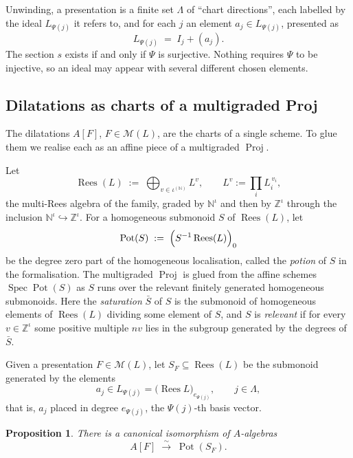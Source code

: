 \documentclass[pdflatex,sn-mathphys-num]{sn-jnl}
\theoremstyle{plain}
\newtheorem{proposition}[theorem]{Proposition}
\theoremstyle{definition}
\newcommand{\Spec}{\operatorname{Spec}}
\newcommand{\Proj}{\operatorname{Proj}}
\newcommand{\Rees}{\operatorname{Rees}}
\newcommand{\Pot}{\operatorname{Pot}}
\newcommand{\Pres}{\mathcal{M}}
\newcommand{\Nat}{\mathbb{N}}
\newcommand{\Int}{\mathbb{Z}}
\begin{document}
Unwinding, a presentation is a finite set $\Lambda$ of ``chart directions'',
each labelled by the ideal $L_{\Psi(j)}$ it refers to, and for each $j$ an
element $a_j \in L_{\Psi(j)}$, presented as
\[
  L_{\Psi(j)} \;=\; I_j + (a_j).
\]
The section $s$ exists if and only if $\Psi$ is surjective. Nothing
requires $\Psi$ to be injective, so an ideal may appear with several different
chosen elements.

\subsection{Dilatations as charts of a multigraded Proj}\label{ssec:proj}

The dilatations $A[F]$, $F \in \Pres(L)$, are the charts of a single scheme.
To glue them we realise each as an affine piece of a multigraded $\Proj$.

Let
\[
  \Rees(L) \;:=\; \bigoplus_{v \in \iota^{(\Nat)}} L^v ,
  \qquad
  L^v := \prod_i L_i^{\,v_i},
\]
the multi-Rees algebra of the family, graded by $\Nat^{\iota}$ and then by
$\Int^\iota$ through the inclusion $\Nat^\iota \hookrightarrow \Int^\iota$. For
a homogeneous submonoid $S$ of $\Rees(L)$, let
\[
  \Pot(S) \;:=\; \Bigl( S^{-1} \Rees(L) \Bigr)_0
\]
be the degree zero part of the homogeneous localisation, called the
\emph{potion} of $S$ in the formalisation. The multigraded $\Proj$ is glued
from the affine schemes $\Spec \Pot(S)$ as $S$ runs over the relevant finitely
generated homogeneous submonoids.
Here the \emph{saturation} $\bar S$ of $S$ is the submonoid of homogeneous
elements of $\Rees(L)$ dividing some element of $S$, and $S$ is
\emph{relevant} if for every $v \in \Int^\iota$ some positive multiple $nv$
lies in the subgroup generated by the degrees of $\bar S$.

Given a presentation $F \in \Pres(L)$, let $S_F \subseteq \Rees(L)$ be the
submonoid generated by the elements
\[
  a_j \in L_{\Psi(j)} = \bigl(\Rees L\bigr)_{e_{\Psi(j)}},
  \qquad j \in \Lambda,
\]
that is, $a_j$ placed in degree $e_{\Psi(j)}$, the $\Psi(j)$-th basis vector.

\begin{proposition}\label{prop:dil-is-potion}
There is a canonical isomorphism of $A$-algebras
\[
  A[F] \;\xrightarrow{\ \sim\ }\; \Pot(S_F).
\]
\end{proposition}
\end{document}
